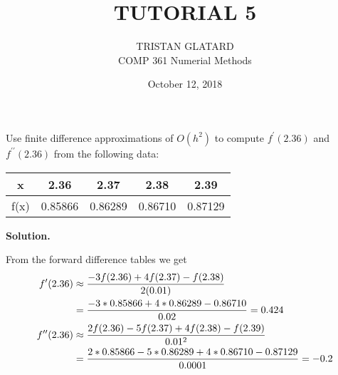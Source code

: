



\title{TUTORIAL 5}%
\author{TRISTAN GLATARD\\ %
COMP 361 Numerial Methods} %
\date{October 12, 2018}
\maketitle

\begin{exercise}{1} %
Use finite difference approximations of \(O(h^2)\) to compute \(f^\prime (2.36)\) and \(f^{\prime \prime} (2.36)\) from the following data:

\begin{table}[h]
\centering
\begin{tabular}{|c|c|c|c|c|}
\hline
x & 2.36 & 2.37 & 2.38 & 2.39 \\ \hline
f(x) & 0.85866 & 0.86289 & 0.86710 & 0.87129 \\ \hline
\end{tabular}
\end{table}

\textbf{Solution.}

From the forward difference tables we get
\begin{align}
f^\prime(2.36) &\approx \frac{-3f(2.36) + 4f(2.37) - f(2.38)}{2(0.01)} \notag \\
&= \frac{-3*0.85866 + 4*0.86289-0.86710}{0.02} = 0.424 \notag \\
f^ {\prime \prime}(2.36) &\approx \frac{2f(2.36) -5f(2.37) + 4f(2.38) - f(2.39)}{0.01^2} \notag \\
&= \frac{2*0.85866 -5*0.86289+4*0.86710-0.87129}{0.0001} = -0.2 \notag
\end{align}
\end{exercise}

